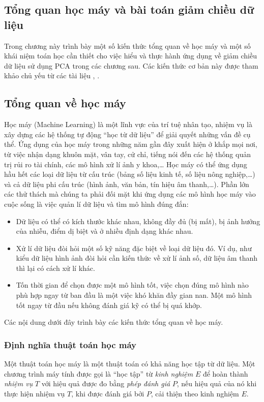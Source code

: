 \setcounter{chapter}{0}
\setcounter{section}{0}
\begin{center}
\chapter{ Tổng quan học máy và bài toán giảm chiều dữ liệu}
\end{center}

Trong chương này trình bày một số kiến thức tổng quan về học máy và một số khái niệm toán học cần thiết cho việc hiểu và thực hành ứng dụng về giảm chiều dữ liệu sử dụng PCA trong các chương sau. Các kiến thức cơ bản này được tham khảo chủ yếu từ các tài liệu \cite{V1}, \cite{V2}.
\section{Tổng quan về học máy}
Học máy (Machine Learning) là một lĩnh vực của trí tuệ nhân tạo, nhiệm vụ là xây dựng các hệ thống tự động “học từ dữ liệu” để giải quyết những vấn đề cụ thể. Ứng dụng của học máy trong những năm gần đây xuất hiện ở khắp mọi nơi, từ việc nhận dạng khuôn mặt, vân tay, cử chỉ, tiếng nói đến các hệ thống quản trị rủi ro tài chính, các mô hình xử lí ảnh y khoa,… Học máy có thể ứng dụng hầu hết các loại dữ liệu từ cấu trúc (bảng số liệu kinh tế, số liệu nông nghiệp,…) và cả dữ liệu phi cấu trúc (hình ảnh, văn bản, tín hiệu âm thanh,…). Phần lớn các thử thách mà chúng ta phải đối mặt khi ứng dụng các mô hình học máy vào cuộc sống là việc quản lí dữ liệu và tìm mô hình đúng đắn:
\begin{itemize}
	\item Dữ liệu có thể có kích thước khác nhau, không đầy đủ (bị mất), bị ảnh hưởng của nhiễu, điểm dị biệt và ở nhiều định dạng khác nhau.
	\item Xử lí dữ liệu đòi hỏi một số kỹ năng đặc biệt về loại dữ liệu đó. Ví dụ, như kiểu dữ liệu hình ảnh đòi hỏi cần kiến thức về xử lí ảnh số, dữ liệu âm thanh thì lại có cách xử lí khác.
	\item Tốn thời gian để chọn được một mô hình tốt, việc chọn đúng mô hình nào phù hợp ngay từ ban đầu là một việc khó khăn đầy gian nan. Một mô hình tốt ngay từ đầu nếu không đánh giá kỹ có thể bị quá khớp.
\end{itemize}

Các nội dung dưới đây trình bày các kiến thức tổng quan về học máy.

\subsection{Định nghĩa thuật toán học máy}
Một thuật toán học máy là một thuật toán có khả năng {học tập} từ dữ
liệu. Một chương trình máy tính được gọi là ``học tập'' từ \textit{kinh nghiệm} $E$
để hoàn thành \textit{nhiệm vụ} $T$ với hiệu quả được đo bằng \textit{phép đánh
	giá} $P$, nếu hiệu quả của nó khi thực hiện nhiệm vụ $T$, khi được đánh giá bởi
$P$, cải thiện theo kinh nghiệm $E$.
